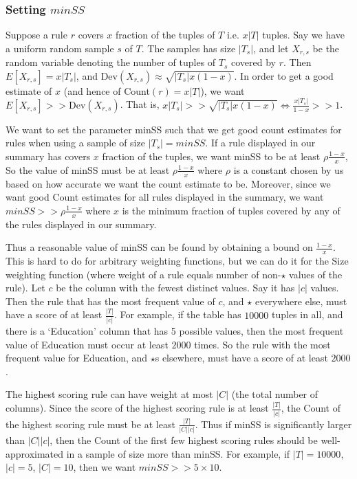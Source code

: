 \subsubsection{Setting $minSS$}
Suppose a rule $r$ covers $x$ fraction of the tuples of $T$ i.e. $x|T|$ tuples. Say we have a uniform random sample $s$ of $T$. The samples has size $|T_s|$, and let $X_{r,s}$ be the random variable denoting the number of tuples of $T_s$ covered by $r$. Then $E\left[ X_{r,s} \right] = x|T_s|$, and $\text{Dev}(X_{r,s}) \approx \sqrt{|T_s|x(1-x)}$. In order to get a good estimate of $x$ (and hence of Count$(r) = x|T|$), we want $E\left[X_{r,s}\right] >> \text{Dev}(X_{r,s})$. That is, $x|T_s| >> \sqrt{|T_s|x(1-x)} \Leftrightarrow \frac{x|T_s|}{1-x} >> 1$. 

We want to set the parameter minSS such that we get good count estimates for rules when using a sample of size $|T_s| = minSS$. If a rule displayed in our summary has covers $x$ fraction of the tuples, we want minSS to be at least $\rho\frac{1-x}{x}$, So the value of minSS must be at least $\rho\frac{1-x}{x}$ where $\rho$ is a constant chosen by us based on how accurate we want the count estimate to be. Moreover, since we want good Count estimates for all rules displayed in the summary, we want $minSS >> \rho\frac{1-x}{x}$ where $x$ is the minimum fraction of tuples covered by any of the rules displayed in our summary.

Thus a reasonable value of minSS can be found by obtaining a bound on $\frac{1-x}{x}$. This is hard to do for arbitrary weighting functions, but we can do it for the Size weighting function (where weight of a rule equals number of non-$\star$ values of the rule). Let $c$ be the column with the fewest distinct values. Say it has $|c|$ values. Then the rule that has the most frequent value of $c$, and $\star$ everywhere else, must have a score of at least $\frac{|T|}{|c|}$. For example, if the table has $10000$ tuples in all, and there is a `Education' column that has 5 possible values, then the most frequent value of Education must occur at least $2000$ times. So the rule with the most frequent value for Education, and $\star$s elsewhere, must have a score of at least $2000$. 

The highest scoring rule can have weight at most $|C|$ (the total number of columns). Since the score of the highest scoring rule is at least $\frac{|T|}{|c|}$, the Count of the highest scoring rule must be at least $\frac{|T|}{|C||c|}$. Thus if minSS is significantly larger than $|C||c|$, then the Count of the first few highest scoring rules should be well-approximated in a sample of size more than minSS. For example, if $|T| = 10000$, $|c| = 5$, $|C| = 10$, then we want $minSS >> 5 \times 10$.
